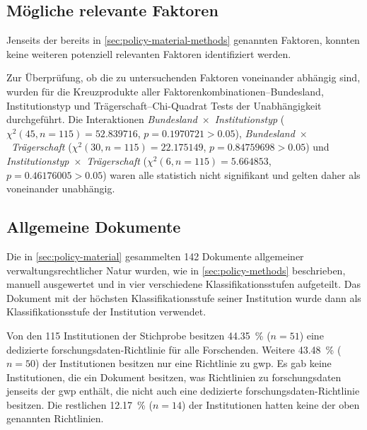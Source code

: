 \subsection{Mögliche relevante Faktoren}
Jenseits der bereits in \cref{sec:policy-material-methods} genannten Faktoren, konnten keine weiteren potenziell relevanten Faktoren identifiziert werden.

Zur Überprüfung, ob die zu untersuchenden Faktoren voneinander abhängig sind, wurden für die Kreuzprodukte aller Faktorenkombinationen--Bundesland, Institutionstyp und Trägerschaft--Chi-Quadrat Tests der Unabhängigkeit durchgeführt.
Die Interaktionen \textit{Bundesland}~$\times$~\textit{Institutionstyp} ($\chi^2 (\num{45}, n=\num{115}) = \num[round-mode=places,round-precision=2]{52,839716}$, $p = \num[round-mode=places,round-precision=2]{0,1970721}>\num{0.05}$), \textit{Bundesland}~$\times$~\textit{Trägerschaft} ($\chi^2 (\num{30}, n=\num{115}) = \num[round-mode=places,round-precision=2]{22,175149}$, $p = \num[round-mode=places,round-precision=2]{0,84759698}>\num{0.05}$) und \textit{Institutionstyp}~$\times$~\textit{Trägerschaft} ($\chi^2 (\num{6}, n=\num{115}) = \num[round-mode=places,round-precision=2]{5,664853}$, $p = \num[round-mode=places,round-precision=2]{0,46176005}>\num{0.05}$) waren alle statistich nicht signifikant und gelten daher als voneinander unabhängig.

\subsection{Allgemeine Dokumente}\label{sec:policy-results-general}
Die in \cref{sec:policy-material} gesammelten \num{142} Dokumente allgemeiner verwaltungsrechtlicher Natur wurden, wie in \cref{sec:policy-methods} beschrieben, manuell ausgewertet und in vier verschiedene Klassifikationsstufen aufgeteilt.
Das Dokument mit der höchsten Klassifikationsstufe seiner Institution wurde dann als Klassifikationsstufe der Institution verwendet.

Von den \num{115} Institutionen der Stichprobe besitzen \SI{44,35}{\percent} ($n=\num{51}$) eine dedizierte \gls{forschungsdaten}-Richtlinie für alle Forschenden.
Weitere \SI{43,48}{\percent} ($n=\num{50}$) der Institutionen besitzen nur eine Richtlinie zu \gls{gwp}.
Es gab keine Institutionen, die ein Dokument besitzen, was Richtlinien zu \gls{forschungsdaten} jenseits der \gls{gwp} enthält, die nicht auch eine dedizierte \gls{forschungsdaten}-Richtlinie besitzen.
Die restlichen \SI{12,17}{\percent} ($n=\num{14}$) der Institutionen hatten keine der oben genannten Richtlinien.

